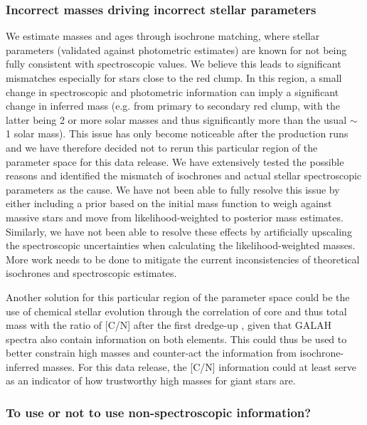\documentclass[
  journal=pasa,
  manuscript=research-paper, %
  year=2024,
  volume=37
]{cup-journal}
\begin{document}
\subsubsection{Incorrect masses driving incorrect stellar parameters}

We estimate masses and ages through isochrone matching, where stellar parameters (validated against photometric estimates) are known for not being fully consistent with spectroscopic values.
We believe this leads to significant mismatches especially for stars close to the red clump. In this region, a small change in spectroscopic and photometric information can imply a significant change in inferred mass (e.g. from primary to secondary red clump, with the latter being 2 or more solar masses and thus significantly more than the usual $\sim$ 1 solar mass). This issue has only become noticeable after the production runs and we have therefore decided not to rerun this particular region of the parameter space for this data release. We have extensively tested the possible reasons and identified the mismatch of isochrones and actual stellar spectroscopic parameters as the cause. We have not been able to fully resolve this issue by either including a prior based on the initial mass function to weigh against massive stars \citep[see e.g.][]{Sharma2018} and move from likelihood-weighted to posterior mass estimates. Similarly, we have not been able to resolve these effects by artificially upscaling the spectroscopic uncertainties when calculating the likelihood-weighted masses. More work needs to be done to mitigate the current inconsistencies of theoretical isochrones and spectroscopic estimates.

Another solution for this particular region of the parameter space could be the use of chemical stellar evolution through the correlation of core and thus total mass with the ratio of [C/N] after the first dredge-up \citep{Masseron2015, Martig2016}, given that GALAH spectra also contain information on both elements. This could thus be used to better constrain high masses and counter-act the information from isochrone-inferred masses. For this data release, the [C/N] information could at least serve as an indicator of how trustworthy high masses for giant stars are.

\subsubsection{To use or not to use non-spectroscopic information?}
\end{document}
